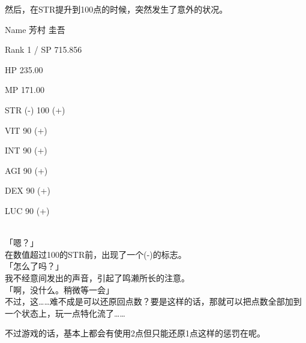 然后，在STR提升到100点的时候，突然发生了意外的状况。\\

\cardline

  Name 芳村 圭吾

  Rank 1 / SP 715.856

  HP  235.00

  MP  171.00

%  
 

  STR (-) 100 (+)

  VIT 90 (+)

  INT 90 (+)

  AGI 90 (+)

  DEX 90 (+)

  LUC 90 (+)

\cardline\\

「嗯？」\\

在数值超过100的STR前，出现了一个(-)的标志。\\

「怎么了吗？」\\

我不经意间发出的声音，引起了鸣濑所长的注意。\\

「啊，没什么。稍微等一会」\\

不过，这……难不成是可以还原回点数？要是这样的话，那就可以把点数全部加到一个状态上，玩一点特化流了……

不过游戏的话，基本上都会有使用2点但只能还原1点这样的惩罚在呢。\\

